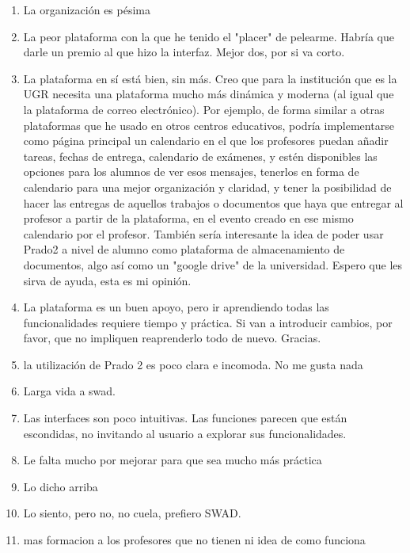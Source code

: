 \begin{enumerate}
\item La organización es pésima
\item La peor plataforma con la que he tenido el "placer" de pelearme. Habría que darle un premio al que hizo la interfaz. Mejor dos, por si va corto.
\item La plataforma en sí está bien, sin más. Creo que para la institución que es la UGR necesita una plataforma mucho más dinámica y moderna (al igual que la plataforma de correo electrónico). Por ejemplo, de forma similar a otras plataformas que he usado en otros centros educativos, podría implementarse como página principal un calendario en el que los profesores puedan añadir tareas, fechas de entrega, calendario de exámenes, y estén disponibles las opciones para los alumnos de ver esos mensajes, tenerlos en forma de calendario para una mejor organización y claridad, y tener la posibilidad de hacer las entregas de aquellos trabajos o documentos que haya que entregar al profesor a partir de la plataforma, en el evento creado en ese mismo calendario por el profesor. También sería interesante la idea de poder usar Prado2 a nivel de alumno como plataforma de almacenamiento de documentos, algo así como un "google drive" de la universidad. Espero que les sirva de ayuda, esta es mi opinión.
\item La plataforma es un buen apoyo, pero ir aprendiendo todas las funcionalidades requiere tiempo y práctica. Si van a introducir cambios, por favor, que no impliquen reaprenderlo todo de nuevo. Gracias.
\item la utilización de Prado 2 es poco clara e incomoda. No me gusta nada
\item Larga vida a swad.
\item Las interfaces son poco intuitivas. Las funciones parecen que están escondidas, no invitando al usuario a explorar sus funcionalidades.
\item Le falta mucho por mejorar para que sea mucho más práctica
\item Lo dicho arriba
\item Lo siento, pero no, no cuela, prefiero SWAD.
\item mas formacion a los profesores que no tienen ni idea de como funciona

\end{enumerate}
